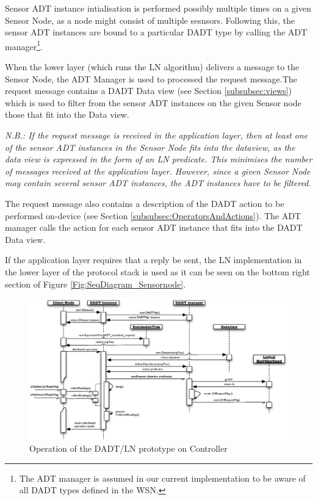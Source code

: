 Sensor ADT instance intialisation is performed possibly
multiple times
on a given Sensor Node, as a node might consist of multiple sesnsors. Following
this, the sensor ADT instances are bound to a particular DADT type by calling
the ADT manager\footnote{The ADT manager is assumed in our
current implementation to be aware of all DADT types defined in the WSN.}.

When the lower layer (which runs the LN algorithm) delivers a message to the
Sensor Node, the ADT Manager is used to processed the request message.The
request message contains a DADT Data view (see Section \ref{subsubsec:views})
which is used to filter from the sensor ADT instances on the given Sensor node
those that fit into the Data view. %

\emph{N.B.: If the request message is received in the application layer, then at least
one of the sensor ADT instances in the Sensor Node fits into the dataview, as
the data view is expressed in the form of an LN predicate. This minimises the
number of messages received at the application layer. However, since a given
Sensor Node may contain several sensor ADT instances, the ADT instances have to
be filtered.}

The request message also contains a description of the DADT action to be
performed on-device (see Section
\ref{subsubsec:OperatorsAndActions}). The ADT manager calls the action for each
sensor ADT instance that fits into the DADT Data view. 

If the application layer requires that a reply be sent, the LN implementation in
the lower layer of the protocol stack is used as it can be seen on the bottom
right section of Figure \ref{Fig:SeqDiagram_Sensornode}.

\begin{figure}
\centering
\includegraphics[width=\textwidth]{img/SeqDiagram_PCnode.eps}
\caption[Operation of the DADT/LN prototype on Controller]{Operation of the DADT/LN prototype on Controller}
\label{Fig:SeqDiagram_PCnode}
\end{figure}


